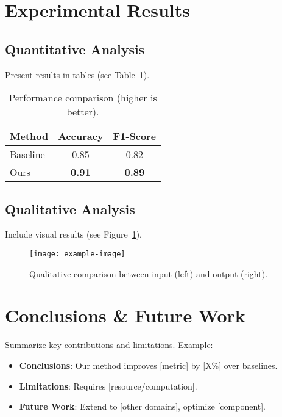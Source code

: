 \documentclass[12pt]{article}
\begin{document}
\section{Experimental Results}
\label{sec:results}
\subsection{Quantitative Analysis}
Present results in tables (see Table~\ref{tab:results}).

\begin{table}[h]
    \centering
    \caption{Performance comparison (higher is better).}
    \label{tab:results}
    \begin{tabular}{lcc}
        \toprule
        Method & Accuracy & F1-Score \\
        \midrule
        Baseline & 0.85 & 0.82 \\
        Ours & \textbf{0.91} & \textbf{0.89} \\
        \bottomrule
    \end{tabular}
\end{table}

\subsection{Qualitative Analysis}
Include visual results (see Figure~\ref{fig:comparison}).

\begin{figure}[h]
    \centering
    \texttt{[image: example-image]} %
    \caption{Qualitative comparison between input (left) and output (right).}
    \label{fig:comparison}
\end{figure}

\section{Conclusions \& Future Work}
\label{sec:conclusion}
Summarize key contributions and limitations. Example:
\begin{itemize}
    \item \textbf{Conclusions}: Our method improves [metric] by [X\%] over baselines.
    \item \textbf{Limitations}: Requires [resource/computation].
    \item \textbf{Future Work}: Extend to [other domains], optimize [component].
\end{itemize}

\end{document}
